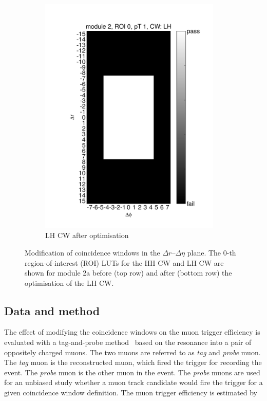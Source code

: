 \begin{figure}[htbp]
\begin{subfigure}[b]{0.45\textwidth}
		\includegraphics[width=0.95\textwidth]{figures/muontrigger/l1mu4/cw_0028/cwplot_module2_roi0_pt1_cwLH.pdf}
		\caption{LH CW after optimisation}
	\end{subfigure}

	\caption{Modification of coincidence windows in the \(\Delta r\)--\(\Delta \eta\) plane. The 0-th region-of-interest (ROI) LUTs for the HH CW and LH CW are shown for module 2a before (top row) and after (bottom row) the optimisation of the LH CW.}
	\label{fig:trigger:l1mu4:cw}
\end{figure}


\subsection{Data and method}
The effect of modifying the coincidence windows on the muon trigger efficiency is evaluated with a tag-and-probe method~\cite{Hensel2013,ATLAS-CONF-2012-099} based on the \PJpsi resonance into a pair of oppositely charged muons. The two muons are referred to as \emph{tag} and \emph{probe} muon. The \emph{tag} muon is the reconstructed muon, which fired the trigger for recording the event. The \emph{probe} muon is the other muon in the event. The \emph{probe} muons are used for an unbiased study whether a muon track candidate would fire the trigger for a given coincidence window definition. The muon trigger efficiency is estimated by

